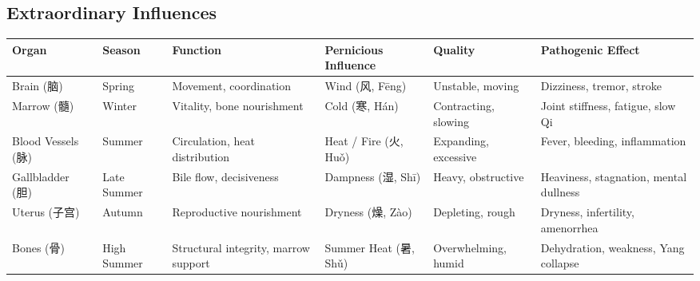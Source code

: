 \documentclass{article}
\begin{document}
\begin{landscape}

\section*{Extraordinary Influences}

\renewcommand{\arraystretch}{1.4}
\setlength{\tabcolsep}{6pt}

\begin{tabular}{>{\raggedright}p{3cm} >{\raggedright}p{2.3cm} >{\raggedright}p{4cm} >{\raggedright}p{3.2cm} >{\raggedright}p{3cm} >{\raggedright\arraybackslash}p{4.5cm}}
\toprule
\textbf{Organ} & \textbf{Season} & \textbf{Function} & \textbf{Pernicious Influence} & \textbf{Quality} & \textbf{Pathogenic Effect} \\
\midrule
Brain (脑) & Spring & Movement, coordination & Wind (风, Fēng) & Unstable, moving & Dizziness, tremor, stroke \\
Marrow (髓) & Winter & Vitality, bone nourishment & Cold (寒, Hán) & Contracting, slowing & Joint stiffness, fatigue, slow Qi \\
Blood Vessels (脉) & Summer & Circulation, heat distribution & Heat / Fire (火, Huǒ) & Expanding, excessive & Fever, bleeding, inflammation \\
Gallbladder (胆) & Late Summer & Bile flow, decisiveness & Dampness (湿, Shī) & Heavy, obstructive & Heaviness, stagnation, mental dullness \\
Uterus (子宫) & Autumn & Reproductive nourishment & Dryness (燥, Zào) & Depleting, rough & Dryness, infertility, amenorrhea \\
Bones (骨) & High Summer & Structural integrity, marrow support & Summer Heat (暑, Shǔ) & Overwhelming, humid & Dehydration, weakness, Yang collapse \\
\bottomrule
\end{tabular}

\end{landscape}
\end{document}
